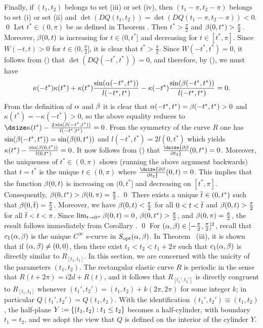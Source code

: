 Finally, if $(t_1,t_2)$ belongs to set (iii) or set (iv), then 
$(t_1-\pi,t_2-\pi)$ belongs to set (i) or set (ii) and
$\det(DQ(t_1,t_2))=\det(DQ(t_1-\pi,t_2-\pi))<0$.
\qed\enddemo
%
 Let $t^*\in(0,\pi)$ be as defined in Theorem \detq.
Then $t^*>\frac\pi2$ and $\beta(0,t^*)>\frac\pi2$. Moreover, $\beta(0,t)$ is 
  increasing for $t\in(0,t^*]$ and   decreasing 
for $t\in[t^*,\pi]$.
\endproclaim
%
Since $W(-t,t)>0$ for $t\in(0,\frac\pi2]$, it is clear that $t^*>\frac\pi2$.
Since $W(-t^*,t^*)=0$, it follows from (\eldefg) that  $\det(DQ(-t^*,t^*))=0$, 
and therefore, by (\elalphar), we must have 
$$
\kappa (-t^*)\kappa (t^*)+\kappa
(t^*){\sin (\alpha(-t^*,t^*)) \over l(-t^*,t^*)}-\kappa (-t^*){\sin (\beta(-t^*,t^*)) \over l(-t^*,t^*)}=0.
$$
From the definition of $\alpha$ and $\beta$ it is clear that
$\alpha (-t^*,t^*)=\beta (-t^*,t^*)>0$ and $\kappa (t^*)=-\kappa
(-t^*)>0$, so the above equality reduces to
$\dsize\kappa (t^*)-{2\sin (\gb (-t^*,t^*))\over l(-t^*,t^*)}=0$.
From the symmetry of the curve $R$ one has $\sin (\beta
(-t^*,t^*))=\sin (\beta (0,t^*))$ and $l(-t^*,t^*)=2l(0,t^*)$ which yields
$\kappa (t^*)-{\sin (\beta (0,t^*))\over l(0,t^*)}=0$.
It now follows from (\elalphar) that
$\dsize{\partial \gb \over \partial t_2}(0,t^*)=0$. Moreover, the
uniqueness of $t^*\in (0,\pi)$ shows (running the above argument
backwards) that $t=t^*$ is the unique $t\in (0,\pi)$ where
$\dsize{\partial \gb \over \partial t_2}(0,t)=0$. This implies that
the function $\beta (0,t)$ is   increasing on $(0,t^*]$ and
decreasing on $[t^*,\pi]$. Consequently,  $\beta (0,t^*)>\beta(0,\pi)=\frac\pi2$.
\qed\enddemo
%
There exists a unique $\overline t\in(0,t^*)$ such that  $\beta(0,\overline t)=\frac\pi2$.
Moreover, we have $\beta(0,t)<\frac\pi2$ for all $0<t<\overline t$ and
$\beta(0,t)>\frac\pi2$ for all $\overline t<t<\pi$.
\endproclaim
{}
Since $\lim_{t\to 0^+}\beta(0,t)=0$, $\beta(0,t^*)> \frac\pi2$, and  $\beta(0,\pi)=\frac\pi2$, the result
follows immediately from Corollary \cortstar.
\qed\enddemo
%
%
%
For $(\alpha,\beta)\in[-\frac\pi2,\frac\pi2]^2$, recall that $c_1(\alpha,\beta)$ is the unique $C^\infty$ s-curve in $S_{\text{opt}}(\alpha,\beta)$.
In Theorem \sunique\ (iii), it is shown that if $(\alpha,\beta)\neq (0,0)$, then there exist $t_1<t_2<t_1+2\pi$ such
that $c_1(\alpha,\beta)$ is directly similar to $R_{[t_1,t_2]}$.  In this section, we are concerned with the unicity of
the parameters $(t_1,t_2)$. 
The rectangular elastic curve $R$ is periodic in the sense that $R(t+2\pi)=i2d+R(t)$, and it follows
that $R_{[t_1',t_2']}$ is directly congruent to $R_{[t_1,t_2]}$ whenever $(t_1',t_2')=(t_1,t_2)+k(2\pi,2\pi)$ for some
integer $k$; in particular $Q(t_1',t_2')=Q(t_1,t_2)$.  With the identification $(t_1',t_2')\equiv(t_1,t_2)$, the half-plane 
$Y:=\{(t_1,t_2):t_1\leq t_2\}$ becomes a half-cylinder, with boundary $t_1=t_2$, and we adopt the view that $Q$ is defined
on the interior of the cylinder $Y$. 

